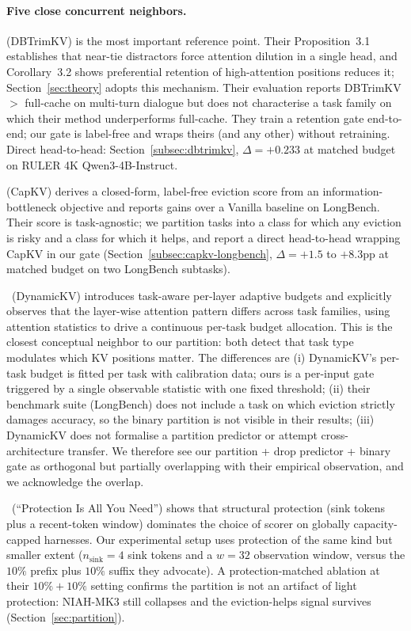 \documentclass{article}
\begin{document}
\paragraph{Five close concurrent neighbors.}
\citet{arxiv260509649} (DBTrimKV) is the most important reference point.
Their Proposition~3.1 establishes that near-tie distractors force attention
dilution in a single head, and Corollary~3.2 shows preferential retention of
high-attention positions reduces it; Section~\ref{sec:theory} adopts this
mechanism. Their evaluation reports DBTrimKV $>$ full-cache on multi-turn
dialogue but does not characterise a task family on which their method
underperforms full-cache. They train a retention gate end-to-end; our gate is
label-free and wraps theirs (and any other) without retraining. Direct
head-to-head: Section~\ref{subsec:dbtrimkv}, $\Delta = +0.233$ at matched
budget on RULER 4K Qwen3-4B-Instruct.

\citet{arxiv260425975}
(CapKV) derives a closed-form, label-free eviction score from an
information-bottleneck objective and reports gains over a Vanilla baseline on
LongBench. Their score is task-agnostic; we partition tasks into a class for
which any eviction is risky and a class for which it helps, and report a
direct head-to-head wrapping CapKV in our gate
(Section~\ref{subsec:capkv-longbench}, $\Delta = +1.5$ to $+8.3$pp at
matched budget on two LongBench subtasks).

\citet{arxiv241214838}~(DynamicKV) introduces task-aware per-layer adaptive
budgets and explicitly observes that the layer-wise attention pattern
differs across task families, using attention statistics to drive a
continuous per-task budget allocation. This is the closest conceptual
neighbor to our partition: both detect that task type modulates which KV
positions matter. The differences are (i) DynamicKV's per-task budget is
fitted per task with calibration data; ours is a per-input gate triggered
by a single observable statistic with one fixed threshold; (ii) their
benchmark suite (LongBench) does not include a task on which eviction
strictly damages accuracy, so the binary partition is not visible in their
results; (iii) DynamicKV does not formalise a partition predictor or
attempt cross-architecture transfer. We therefore see our partition + drop
predictor + binary gate as orthogonal but partially overlapping with their
empirical observation, and we acknowledge the overlap.

\citet{arxiv260518053}~(``Protection Is All You Need'')
shows that structural protection (sink tokens plus a recent-token window)
dominates the choice of scorer on globally capacity-capped harnesses. Our
experimental setup uses protection of the same kind but smaller extent
($n_{\text{sink}} = 4$ sink tokens and a $w = 32$ observation window, versus
the $10\%$ prefix plus $10\%$ suffix they advocate). A protection-matched
ablation at their $10\% + 10\%$ setting confirms the partition is not an
artifact of light protection: NIAH-MK3 still collapses and the
eviction-helps signal survives (Section~\ref{sec:partition}).
\end{document}

